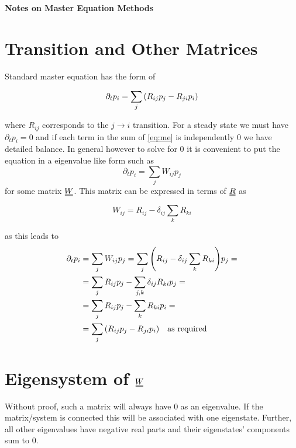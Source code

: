 \documentclass[11pt]{article}
\newcommand{\duf}[2]{\stackunder[0.5pt]{\stackunder[0.8pt]{\stackunder[1pt]{\ensuremath{#1}}{\rule{\widthof{\ensuremath{#2}}*\real{0.9}}{.1ex}}}{\rule{\widthof{\ensuremath{#2}}*\real{0.9}}{.1ex}}}{}}
\newcommand{\du}[1]{\duf{#1}{#1}}
\begin{document}
\begin{center}
	\LARGE
	\textbf{Notes on Master Equation Methods}
	\vspace{1em}
\end{center}

\section{Transition and Other Matrices}
Standard master equation has the form of
\begin{tcolorbox}
	\begin{equation}\label{eq:me}
		\partial_t p_i = \sum_j \qty(R_{ij}p_j - R_{ji}p_i)
	\end{equation}
\end{tcolorbox}
where $R_{ij}$ corresponds to the $j \rightarrow i$ transition.
For a steady state we must have $\partial_t p_i=0$ and if each term in the sum of \cref{eq:me} is independently 0 we have detailed balance.
In general however to solve for 0 it is convenient to put the equation in a eigenvalue like form such as
\begin{equation}\label{eq:dp}
	\partial_t p_i = \sum_j W_{ij}p_j
\end{equation}
for some matrix $\du{W}$.
This matrix can be expressed in terms of $\du{R}$ as
\begin{tcolorbox}
	\begin{equation}
		W_{ij} = R_{ij}-\delta_{ij}\sum_k R_{ki}
	\end{equation}
\end{tcolorbox}
as this leads to
\begin{align}
	\partial_t p_i & = \sum_j W_{ij}p_j = \sum_j \qty(R_{ij}-\delta_{ij}\sum_k R_{ki}) p_j = \\
	               & = \sum_j R_{ij}p_j - \sum_{j,k}\delta_{ij} R_{ki} p_j =                 \\
	               & = \sum_j R_{ij}p_j - \sum_{k} R_{ki} p_i =                              \\
	               & = \sum_j \qty(R_{ij}p_j - R_{ji} p_i) \qq{as required}
\end{align}

\section{Eigensystem of $\du{W}$}
Without proof, such a matrix will always have 0 as an eigenvalue.
If the matrix/system is connected this will be associated with one eigenstate.
Further, all other eigenvalues have negative real parts and their eigenstates' components sum to 0.
\end{document}
